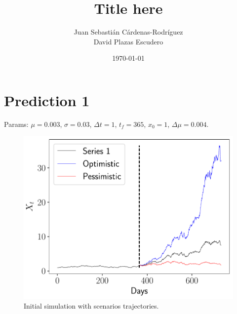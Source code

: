\documentclass[11pt]{article}
\title{Title here}
\author{Juan Sebasti\'an C\'ardenas-Rodríguez \\
       David Plazas Escudero \\
       \scalebox{0.7}{Mathematical Engineering, Universidad EAFIT}}
\date{\today}
\theoremstyle{definition}
\theoremstyle{remark}
\theoremstyle{remark}
\begin{document}
\maketitle
\section{Prediction 1}
Params: $\mu = 0.003$, $\sigma = 0.03$, $\Delta t = 1$, $t_f = 365$, $x_0 = 1$, $\Delta \mu = 0.004$.

\begin{figure}[H]
  \centering
  \includegraphics[scale=0.5]{pronostico-1-escenarios.pdf}
  \caption{Initial simulation with scenarios trajectories.}
  \label{fig:scenarios}
\end{figure}
\end{document}
